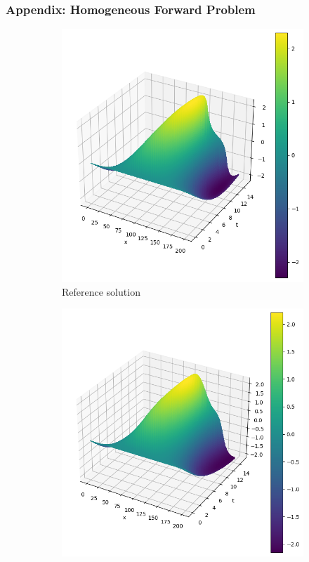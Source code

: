 \begin{frame}
    \frametitle{Appendix: Homogeneous Forward Problem}

    \begin{figure}
        \centering
        \begin{subfigure}[b]{0.45\textwidth}
            \centering
            \includegraphics[width=\textwidth]{images/homogeneous_swe_pseudospectral_velocity.png}
            \caption{Reference solution}
            \label{fig:10_homogeneous_pseudospectral_swe_velocity}
        \end{subfigure}
        \hfill
        \begin{subfigure}[b]{0.45\textwidth}
            \centering
            \includegraphics[width=\textwidth]{images/homogeneous_swe_pinn_velocity.png}

\end{subfigure}
\end{figure}
\end{frame}
